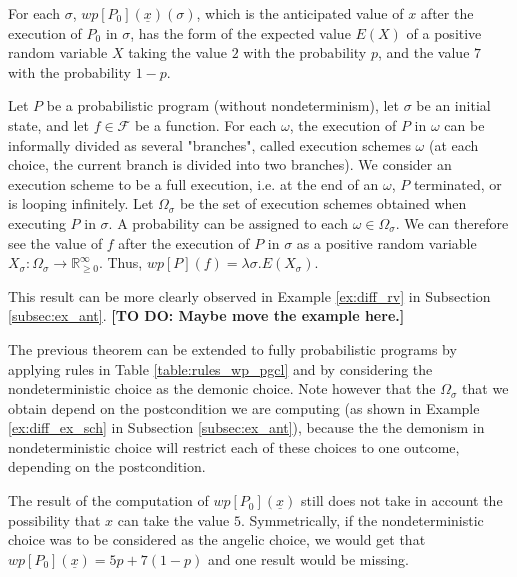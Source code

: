 \documentclass[a4paper,10pt]{llncs}
\def\RRposi {{\mathbb R_{\geq 0}^{\infty}}}
\newcommand\todo[1]{{\color{red}\textbf{[TO DO:  #1]}}}
\begin{document}
\begin{remark}
For each $\sigma$, $wp[P_0](\underline{x})(\sigma)$, which is the anticipated value of $x$ after the execution of $P_0$ in $\sigma$, has the form of the expected value $E(X)$ of a positive random variable $X$ taking the value $2$ with the probability $p$, and the value $7$ with the probability $1-p$.\newline
\end{remark}
\begin{theorem}
Let $P$ be a probabilistic program (without nondeterminism), let $\sigma$ be an initial state, and let $f \in \mathcal{F}$ be a function. For each $\omega$, the execution of $P$ in $\omega$ can be informally divided as several "branches", called execution schemes $\omega$ (at each choice, the current branch is divided into two branches). We consider an execution scheme to be a full execution, i.e. at the end of an $\omega$, $P$ terminated, or is looping infinitely. Let $\Omega_\sigma$ be the set of execution schemes obtained when executing $P$ in $\sigma$. A probability can be assigned to each $\omega \in \Omega_\sigma$. We can therefore see the value of $f$ after the execution of $P$ in $\sigma$ as a positive random variable $X_\sigma : \Omega_\sigma \rightarrow \RRposi$.\newline
Thus, $wp[P](f) = \lambda\sigma.E(X_\sigma)$.
\end{theorem}
This result can be more clearly observed in Example \ref{ex:diff_rv} in Subsection \ref{subsec:ex_ant}.
\todo{Maybe move the example here.}
\begin{remark}
The previous theorem can be extended to fully probabilistic programs by applying rules in Table \ref{table:rules_wp_pgcl} and by considering the nondeterministic choice as the demonic choice. Note however that the $\Omega_\sigma$ that we obtain depend on the postcondition we are computing (as shown in Example \ref{ex:diff_ex_sch} in Subsection \ref{subsec:ex_ant}), because the the demonism in nondeterministic choice will restrict each of these choices to one outcome, depending on the postcondition.\newline
\end{remark}
\begin{remark}
The result of the computation of $wp[P_0](\underline{x})$ still does not take in account the possibility that $x$ can take the value $5$.
Symmetrically, if the nondeterministic choice was to be considered as the angelic choice, we would get that $wp[P_0](\underline{x}) = 5p+7(1-p)$ and one result would be missing.
\end{remark}
\end{document}
